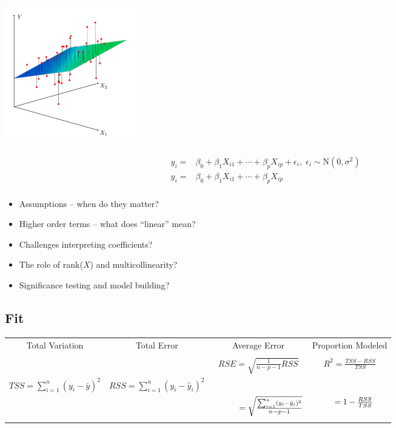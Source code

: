 \documentclass[11pt, oneside]{article}
\begin{document}
\noindent \begin{minipage}{0.4\linewidth} 
\includegraphics[width=2.25in]{OLS2.png} 
\end{minipage}
\begin{minipage}{0.55\linewidth} 
\vspace{-2em}
\begin{align*}
y_i ={}& \beta_0+\beta_1X_{i1} + \cdots + \beta_pX_{ip} + \epsilon_i,  \;  \epsilon_i \sim \textrm{N}(0,\sigma^2) \\ 
\hat y_i ={}& \beta_0+\beta_1X_{i1} + \cdots + \beta_pX_{ip} \\
\end{align*}

\begin{itemize}
\item Assumptions  -- when do they matter? 
\item Higher order terms -- what does ``linear'' mean? 
\item Challenges interpreting coefficients? 
\item The role of rank($X$) and multicollinearity? %
\item Significance testing and model building?
\end{itemize}

\end{minipage}

   
\subsection{Fit}

\begin{table}[h!]
\centering
\begin{tabular}{|c|c|c|c|}
\hline
Total Variation & Total Error & Average Error & Proportion Modeled\\
&&&\\
&&$RSE = \sqrt{\frac{1}{n-p-1}RSS}$ & $R^2 = \frac{TSS - RSS}{TSS}$ \\
$TSS = \sum_{i=1}^n(y_i - \bar y)^2$ &  $RSS = \sum_{i=1}^n(y_i - \hat y_i)^2$ & &\\
&&$\textcolor{white}{RSE^2} = \sqrt{\frac{\sum_{i=1}^n(y_i - \hat y_i)^2}{n-p-1}}$ &$\textcolor{white}{R} = 1-\frac{RSS}{TSS}$\\
&&&\\ \hline
\end{tabular}
\end{table}
\end{document}
